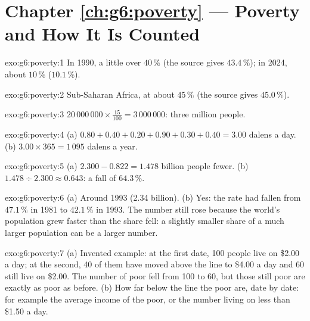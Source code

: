 \section*{Chapter \ref{ch:g6:poverty} --- Poverty and How It Is Counted}

\begin{solution}{exo:g6:poverty:1}
In 1990, a little over $40\,\%$ (the source gives $43.4\,\%$); in 2024, about
$10\,\%$ ($10.1\,\%$).
\end{solution}

\begin{solution}{exo:g6:poverty:2}
Sub-Saharan Africa, at about $45\,\%$ (the source gives $45.0\,\%$).
\end{solution}

\begin{solution}{exo:g6:poverty:3}
$20\,000\,000 \times \frac{15}{100} = 3\,000\,000$: three million people.
\end{solution}

\begin{solution}{exo:g6:poverty:4}
(a) $0.80 + 0.40 + 0.20 + 0.90 + 0.30 + 0.40 = 3.00$ dalens a day.
(b) $3.00 \times 365 = 1\,095$ dalens a year.
\end{solution}

\begin{solution}{exo:g6:poverty:5}
(a) $2.300 - 0.822 = 1.478$ billion people fewer. (b) $1.478 \div 2.300 \approx
0.643$: a fall of $64.3\,\%$.
\end{solution}

\begin{solution}{exo:g6:poverty:6}
(a) Around 1993 (2.34 billion). (b) Yes: the rate had fallen from $47.1\,\%$ in
1981 to $42.1\,\%$ in 1993. The number still rose because the world's
population grew faster than the share fell: a slightly smaller share of a much
larger population can be a larger number.
\end{solution}

\begin{solution}{exo:g6:poverty:7}
(a) Invented example: at the first date, 100 people live on \$2.00 a day; at the
second, 40 of them have moved above the line to \$4.00 a day and 60 still live on
\$2.00. The number of poor fell from 100 to 60, but those still poor are exactly as
poor as before. (b) How far below the line the poor are, date by date: for
example the average income of the poor, or the number living on less than
\$1.50 a day.
\end{solution}

